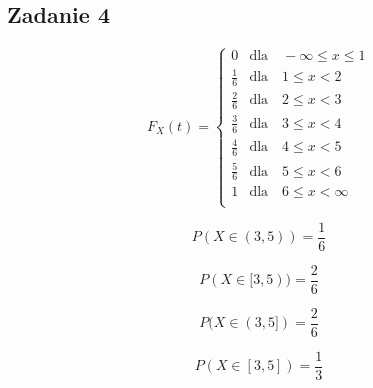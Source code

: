 \subsection{Zadanie 4}

$$
F_{X}(t) = \left\{
\begin{array}{ll}
0 & \text{dla} \quad -\infty \leq x \le 1 \\
\frac{1}{6} & \text{dla} \quad 1 \leq x < 2 \\
\frac{2}{6} & \text{dla} \quad 2 \leq x < 3 \\
\frac{3}{6} & \text{dla} \quad 3 \leq x < 4 \\
\frac{4}{6} & \text{dla} \quad 4 \leq x < 5 \\
\frac{5}{6} & \text{dla} \quad 5 \leq x < 6 \\
1 & \text{dla} \quad 6 \leq x < \infty \\
\end{array}
\right.
$$

$$
P(X \in (3,5)) = \frac{1}{6}
$$

$$
P(X \in [3,5)) = \frac{2}{6}
$$

$$
P(X \in (3,5]) = \frac{2}{6}
$$

$$
P(X \in [3,5]) = \frac{1}{3}
$$